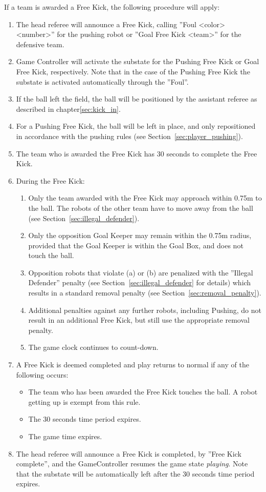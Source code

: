 \documentclass[12pt]{article}
\newcommand{\FreeKickTime}{30 seconds\xspace}
\newcommand{\FreeKickRadius}{0.75m\xspace}
\begin{document}
If a team is awarded a Free Kick, the following procedure will apply:
\begin{enumerate}
  \item The head referee will announce a Free Kick, calling ''Foul \textless color\textgreater \textless number\textgreater'' for the pushing robot or ''Goal Free Kick \textless team\textgreater'' for the defensive team.
  \item Game Controller will activate the substate for the Pushing Free Kick or Goal Free Kick, respectively. Note that in the case of the Pushing Free Kick the substate is activated automatically through the ''Foul''. 
  \item If the ball left the field, the ball will be positioned by the assistant referee as described in chapter\ref{sec:kick_in}.
  \item For a Pushing Free Kick, the ball will be left in place, and only repositioned in accordance with the pushing
  rules (see Section~\ref{sec:player_pushing}).
  \item The team who is awarded the Free Kick has \FreeKickTime to complete the Free Kick.
  \item During the Free Kick:
  \begin{enumerate}
    \item Only the team awarded with the Free Kick may approach within \FreeKickRadius to the ball. The robots of the other team have to move away from the ball (see Section~\ref{sec:illegal_defender}).
    \item Only the opposition Goal Keeper may remain within the \FreeKickRadius radius, provided that the Goal Keeper is
    within the Goal Box, and does not touch the ball.
    \item Opposition robots that violate (a) or (b) are penalized with the ''Illegal Defender'' penalty (see Section~\ref{sec:illegal_defender} for details) which results in a standard removal penalty (see Section~\ref{sec:removal_penalty}).
    \item Additional penalties against any further robots, including Pushing, do not result in an additional Free
    Kick, but still use the appropriate removal penalty.
    \item The game clock continues to count-down. 
  \end{enumerate}
  \item A Free Kick is deemed completed and play returns to normal if any of the following occurs:
  \begin{itemize}
    \item The team who has been awarded the Free Kick touches the ball. A robot getting up is exempt from this rule.
    \item The \FreeKickTime time period expires.
    \item The game time expires.
  \end{itemize}
  \item The head referee will announce a Free Kick is completed, by ''Free Kick complete'', and the GameController
  resumes the game state \emph{playing}. Note that the substate will be automatically left after the \FreeKickTime time
  period expires.
\end{enumerate}
\end{document}
